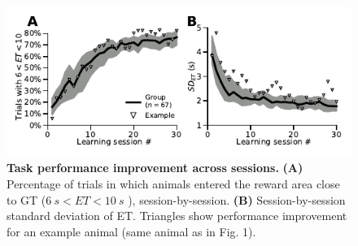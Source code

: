 \begin{figure}[h!]
 \begin{center}
	\includegraphics[width=0.9\linewidth]{Figures/CorrectTrialCurve.pdf}
	\caption
	{\textbf{Task performance improvement across sessions.}
	\textbf{(A)} Percentage of trials in which animals entered the reward area close to GT ($6~s<ET<10~s$ ), session-by-session.
	\textbf{(B)} Session-by-session standard deviation of ET. Triangles show performance improvement for an example animal (same animal as in Fig. 1).
	}
	\label{sfig1}
 \end{center}
\end{figure}
